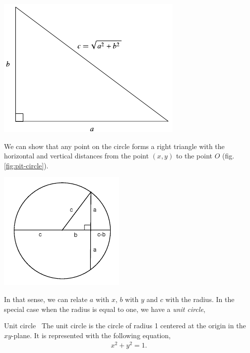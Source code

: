 \documentclass[../main-notes.tex]{subfiles}
\begin{document}
\begin{marginfigure}
    \centering
    \includegraphics[width=\textwidth]{../Figures/circunference/PythagoreanTheoremFigure_1000.pdf}
    \caption{Sketch for the board for the pythagoream theorem.}\label{fig:PitagoreanTheorem}
\end{marginfigure}

We can show that any point on the circle forms a right triangle with the horizontal and vertical distances from the point $(x,y)$ to the point $O$ (fig.\ref{fig:pit-circle}).
\begin{marginfigure}
    \centering
    \includegraphics[widht=0.45\textwidth]{../Figures/circunference/pythagoream-circle.png}
    \caption{Relation between pythagorean theorem and the circle.}\label{fig:pit-circle}
\end{marginfigure}
In that sense, we can relate $a$ with $x$, $b$ with $y$ and $c$ with the radius.
In the special case when the radius is equal to one, we have a \textit{unit circle},

\begin{definition}{Unit circle}{~}
    The unit circle is the circle of radius 1 centered at the origin in the $xy$-plane.
    It is represented with the following equation,
    \begin{gather*}
        x^2 + y^2 = 1.
    \end{gather*}
\end{definition}
\end{document}
